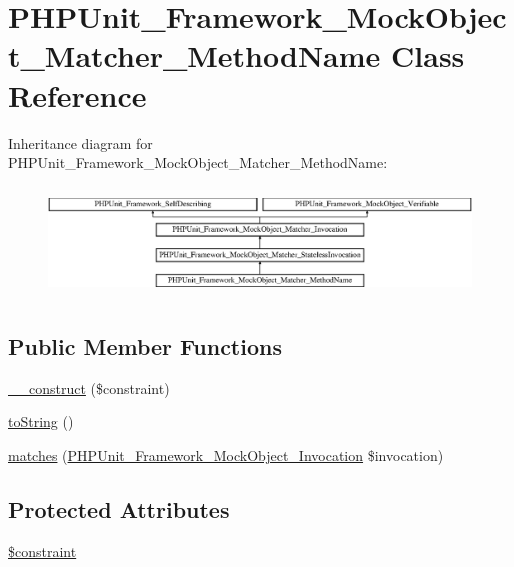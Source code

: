 \hypertarget{class_p_h_p_unit___framework___mock_object___matcher___method_name}{}\section{P\+H\+P\+Unit\+\_\+\+Framework\+\_\+\+Mock\+Object\+\_\+\+Matcher\+\_\+\+Method\+Name Class Reference}
\label{class_p_h_p_unit___framework___mock_object___matcher___method_name}
Inheritance diagram for P\+H\+P\+Unit\+\_\+\+Framework\+\_\+\+Mock\+Object\+\_\+\+Matcher\+\_\+\+Method\+Name\+:\begin{figure}[H]
\begin{center}
\leavevmode
\includegraphics[height=2.947368cm]{class_p_h_p_unit___framework___mock_object___matcher___method_name}
\end{center}
\end{figure}
\subsection*{Public Member Functions}
\begin{DoxyCompactItemize}
\item 
\mbox{\hyperlink{class_p_h_p_unit___framework___mock_object___matcher___method_name_a6e8cb639ef35c3654e8528d5a5c927e6}{\+\_\+\+\_\+construct}} (\$constraint)
\item 
\mbox{\hyperlink{class_p_h_p_unit___framework___mock_object___matcher___method_name_a5558c5d549f41597377fa1ea8a1cefa3}{to\+String}} ()
\item 
\mbox{\hyperlink{class_p_h_p_unit___framework___mock_object___matcher___method_name_a4988c6fa11e275302172d0a4ae32dd3a}{matches}} (\mbox{\hyperlink{interface_p_h_p_unit___framework___mock_object___invocation}{P\+H\+P\+Unit\+\_\+\+Framework\+\_\+\+Mock\+Object\+\_\+\+Invocation}} \$invocation)
\end{DoxyCompactItemize}
\subsection*{Protected Attributes}
\begin{DoxyCompactItemize}
\item 
\mbox{\hyperlink{class_p_h_p_unit___framework___mock_object___matcher___method_name_a50d9f10107fdcde72e77c91a07d654cd}{\$constraint}}
\end{DoxyCompactItemize}


